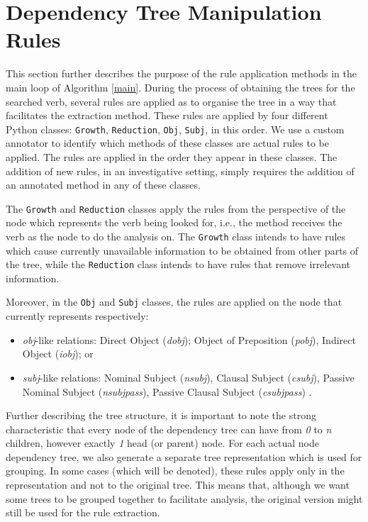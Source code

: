 \documentclass[11pt,a4paper,openright]{memoir}
\begin{document}
%
%
%
%

\section{Dependency Tree Manipulation Rules}
\label{section:rules}

This section further describes the purpose of the rule application methods in the main loop of Algorithm \ref{main}. During the process of obtaining the trees for the searched verb, several rules are applied as to organise the tree in a way that facilitates the extraction method. These rules are applied by four different Python classes: \texttt{Growth}, \texttt{Reduction}, \texttt{Obj}, \texttt{Subj}, in this order. We use a custom annotator to identify which methods of these classes are actual rules to be applied. The rules are applied in the order they appear in these classes. The addition of new rules, in an investigative setting, simply requires the addition of an annotated method in any of these classes.

The \texttt{Growth} and \texttt{Reduction} classes apply the rules from the perspective of the node which represents the verb being looked for, i.e., the method receives the verb as the node to do the analysis on. The \texttt{Growth} class intends to have rules which cause currently unavailable information to be obtained from other parts of the tree, while the \texttt{Reduction} class intends to have rules that remove irrelevant information.

Moreover, in the \texttt{Obj} and \texttt{Subj} classes, the rules are applied on the node that currently represents respectively:

\begin{itemize}
  \item \emph{obj}-like relations: Direct Object (\emph{dobj}); Object of Preposition (\emph{pobj}), Indirect Object (\emph{iobj}); or
  \item \emph{subj}-like relations: Nominal Subject (\emph{nsubj}), Clausal Subject  (\emph{csubj}), Passive Nominal Subject (\emph{nsubjpass}), Passive Clausal Subject (\emph{csubjpass}) \cite{Marneffe08stanfordtyped}.
\end{itemize}

Further describing the tree structure, it is important to note the strong characteristic that every node of the dependency tree can have from \emph{0} to \emph{n} children, however exactly \emph{1} head (or parent) node. For each actual node dependency tree, we also generate a separate tree representation which is used for grouping. In some cases (which will be denoted), these rules apply only in the representation and not to the original tree. This means that, although we want some trees to be grouped together to facilitate analysis, the original version might still be used for the rule extraction.
\end{document}
